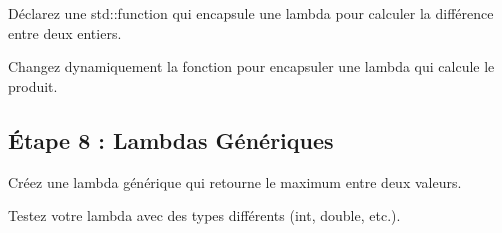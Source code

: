 \begin{DoxyEnumerate}
\item Déclarez une {\ttfamily std\+::function} qui encapsule une lambda pour calculer la différence entre deux entiers.
\item Changez dynamiquement la fonction pour encapsuler une lambda qui calcule le produit.
\end{DoxyEnumerate}

\subsection*{Étape 8 \+: Lambdas Génériques}


\begin{DoxyEnumerate}
\item Créez une lambda générique qui retourne le maximum entre deux valeurs.
\item Testez votre lambda avec des types différents ({\ttfamily int}, {\ttfamily double}, etc.). 
\end{DoxyEnumerate}